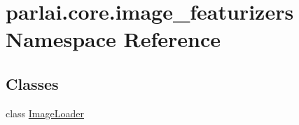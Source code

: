 \hypertarget{namespaceparlai_1_1core_1_1image__featurizers}{}\section{parlai.\+core.\+image\+\_\+featurizers Namespace Reference}
\label{namespaceparlai_1_1core_1_1image__featurizers}
\subsection*{Classes}
\begin{DoxyCompactItemize}
\item 
class \hyperlink{classparlai_1_1core_1_1image__featurizers_1_1ImageLoader}{Image\+Loader}
\end{DoxyCompactItemize}
